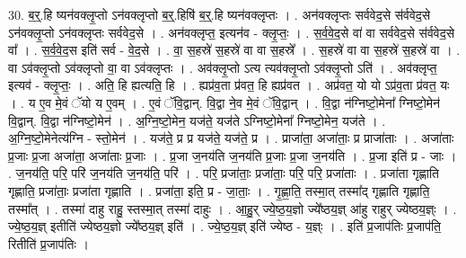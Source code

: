 \documentclass[17pt]{extarticle}
\begin{document}
30. ब॒र्॒.हि ष्यन॑वक्लृ॒प्तो ऽन॑वक्लृप्तो ब॒र्॒.हिषि॑ ब॒र्॒.हि ष्यन॑वक्लृप्तः । . अन॑वक्लृप्तः सर्ववेद॒से स॑र्ववेद॒से ऽन॑वक्लृ॒प्तो ऽन॑वक्लृप्तः सर्ववेद॒से । . अन॑वक्लृप्त॒ इत्यन॑व - क्लृ॒प्तः॒ । . स॒र्व॒वे॒द॒से वा॑ वा सर्ववेद॒से स॑र्ववेद॒से वा᳚ । . स॒र्व॒वे॒द॒स इति॑ सर्व - वे॒द॒से । . वा॒ स॒हस्रे॑ स॒हस्रे॑ वा वा स॒हस्रे᳚ । . स॒हस्रे॑ वा वा स॒हस्रे॑ स॒हस्रे॑ वा । . वा ऽव॑क्लृ॒प्तो ऽव॑क्लृप्तो वा॒ वा ऽव॑क्लृप्तः । . अव॑क्लृ॒प्तो ऽत्य त्यव॑क्लृ॒प्तो ऽव॑क्लृ॒प्तो ऽति॑ । . अव॑क्लृप्त॒ इत्यव॑ - क्लृ॒प्तः॒ । . अति॒ हि ह्यत्यति॒ हि । . ह्यप्र॑व॒ता प्र॑वत॒ हि ह्यप्र॑वत । . अप्र॑वत॒ यो यो ऽप्र॑व॒ता प्र॑वत॒ यः । . य ए॒व मे॒वं ॅयो य ए॒वम् । . ए॒वं ॅवि॒द्वान्. वि॒द्वा ने॒व मे॒वं ॅवि॒द्वान् । . वि॒द्वा न॑ग्निष्टो॒मेना᳚ ग्निष्टो॒मेन॑ वि॒द्वान्. वि॒द्वा न॑ग्निष्टो॒मेन॑ । . अ॒ग्नि॒ष्टो॒मेन॒ यज॑ते॒ यज॑ते ऽग्निष्टो॒मेना᳚ ग्निष्टो॒मेन॒ यज॑ते । . अ॒ग्नि॒ष्टो॒मेनेत्य॑ग्नि - स्तो॒मेन॑ । . यज॑ते॒ प्र प्र यज॑ते॒ यज॑ते॒ प्र । . प्राजा॑ता॒ अजा॑ताः॒ प्र प्राजा॑ताः । . अजा॑ताः प्र॒जाः प्र॒जा अजा॑ता॒ अजा॑ताः प्र॒जाः । . प्र॒जा ज॒नय॑ति ज॒नय॑ति प्र॒जाः प्र॒जा ज॒नय॑ति । . प्र॒जा इति॑ प्र - जाः । . ज॒नय॑ति॒ परि॒ परि॑ ज॒नय॑ति ज॒नय॑ति॒ परि॑ । . परि॒ प्रजा॑ताः॒ प्रजा॑ताः॒ परि॒ परि॒ प्रजा॑ताः । . प्रजा॑ता गृह्णाति गृह्णाति॒ प्रजा॑ताः॒ प्रजा॑ता गृह्णाति । . प्रजा॑ता॒ इति॒ प्र - जा॒ताः॒ । . गृ॒ह्णा॒ति॒ तस्मा॒त् तस्मा᳚द् गृह्णाति गृह्णाति॒ तस्मा᳚त् । . तस्मा॑ दाहु राहु॒ स्तस्मा॒त् तस्मा॑ दाहुः । . आ॒हु॒र् ज्ये॒ष्ठ॒य॒ज्ञो ज्ये᳚ष्ठय॒ज्ञ् आ॑हु राहुर् ज्येष्ठय॒ज्ञ्ः । . ज्ये॒ष्ठ॒य॒ज्ञ् इतीति॑ ज्येष्ठय॒ज्ञो ज्ये᳚ष्ठय॒ज्ञ् इति॑ । . ज्ये॒ष्ठ॒य॒ज्ञ् इति॑ ज्येष्ठ - य॒ज्ञ्ः । . इति॑ प्र॒जाप॑तिः प्र॒जाप॑ति॒ रितीति॑ प्र॒जाप॑तिः । \newline
\end{document}
